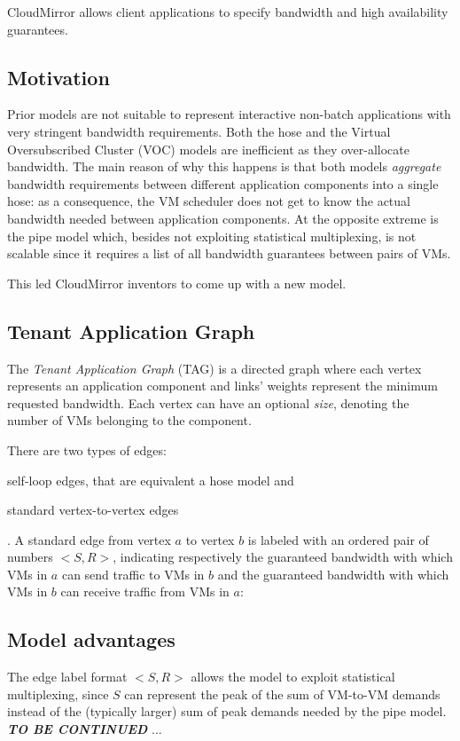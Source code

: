 CloudMirror \cite{cloudmirror} allows client applications to specify bandwidth and high availability guarantees.

\subsection{Motivation}
Prior models are not suitable to represent interactive non-batch applications with very stringent bandwidth requirements.
Both the hose and the Virtual Oversubscribed Cluster (VOC) models are inefficient as they over-allocate bandwidth.
The main reason of why this happens is that both models \textit{aggregate} bandwidth requirements between different application components into a single hose: as a consequence, the VM scheduler does not get to know the actual bandwidth needed between application components. At the opposite extreme is the pipe model which, besides not exploiting statistical multiplexing, is not scalable since it requires a list of all bandwidth guarantees between pairs of VMs.\par
This led CloudMirror \cite{cloudmirror} inventors to come up with a new model.

\subsection{Tenant Application Graph}
The \textit{Tenant Application Graph} (TAG) is a directed graph where each vertex represents an application component and links' weights represent the minimum requested bandwidth. Each vertex can have an optional \textit{size}, denoting the number of VMs belonging to the component.\par
There are two types of edges:
\begin{mylist}
    \item self-loop edges, that are equivalent a hose model and
    \item standard vertex-to-vertex edges
\end{mylist}.
A standard edge from vertex $a$ to vertex $b$ is labeled with an ordered pair of numbers $<S, R>$, indicating respectively the guaranteed bandwidth with which VMs in $a$ can send traffic to VMs in $b$ and the guaranteed bandwidth with which VMs in $b$ can receive traffic from VMs in $a$: 

\subsection{Model advantages}
The edge label format $<S, R>$ allows the model to exploit statistical multiplexing, since $S$ can represent the peak of the sum of VM-to-VM demands instead of the (typically larger) sum of peak demands needed by the pipe model.
\textbf{\textit{TO BE CONTINUED}} ...

